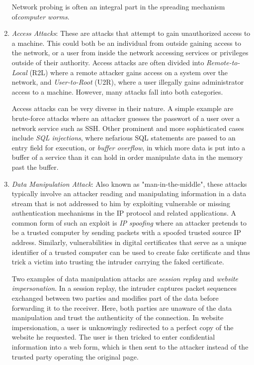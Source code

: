 \documentclass[a4paper,12pt,twoside]{report}
\begin{document}
\begin{enumerate}
Network probing is often an integral part in the spreading mechanism of\textit{computer worms}.

\item \textit{Access Attacks}: These are attacks that attempt to gain unauthorized access to a machine. This could both be an individual from outside gaining access to the network, or a user from inside the network accessing services or privileges outside of their authority. Access attacks are often divided into \textit{Remote-to-Local} (R2L) where a remote attacker gains access on a system over the network, and \textit{User-to-Root} (U2R), where a user illegally gains administrator access to a machine. However, many attacks fall into both categories. 

Access attacks can be very diverse in their nature. A simple example are brute-force attacks where an attacker guesses the passwort of a user over a network service such as SSH. Other prominent and more sophisticated cases include \textit{SQL injections}, where nefarious SQL statements are passed to an entry field for execution, or \textit{buffer overflow}, in which more data is put into a buffer of a service than it can hold in order manipulate data in the memory past the buffer.


\item \textit{Data Manipulation Attack}: Also known as "man-in-the-middle", these attacks typically involve an attacker reading and manipulating information in a data stream that is not addressed to him by exploiting vulnerable or missing authentication mechanisms in the IP protocol and related applications. A common form of such an exploit is \textit{IP spoofing} where an attacker pretends to be a trusted computer by sending packets with a spoofed trusted source IP address. Similarly, vulnerabilities in digital certificates that serve as a unique identifier of a trusted computer can be used to create fake certificate and thus trick a victim into trusting the intruder carrying the faked certificate.

Two examples of data manipulation attacks are \textit{session replay} and \textit{website impersonation}. In a session replay, the intruder captures packet sequences exchanged between two parties and modifies part of the data before forwarding it to the receiver. Here, both parties are unaware of the data manipulation and trust the authenticity of the connection. In website impersionation, a user is unknowingly redirected to a perfect copy of the website he requested. The user is then tricked to enter confidential information into a web form, which is then sent to the attacker instead of the trusted party operating the original page. 



\end{enumerate}
\end{document}
